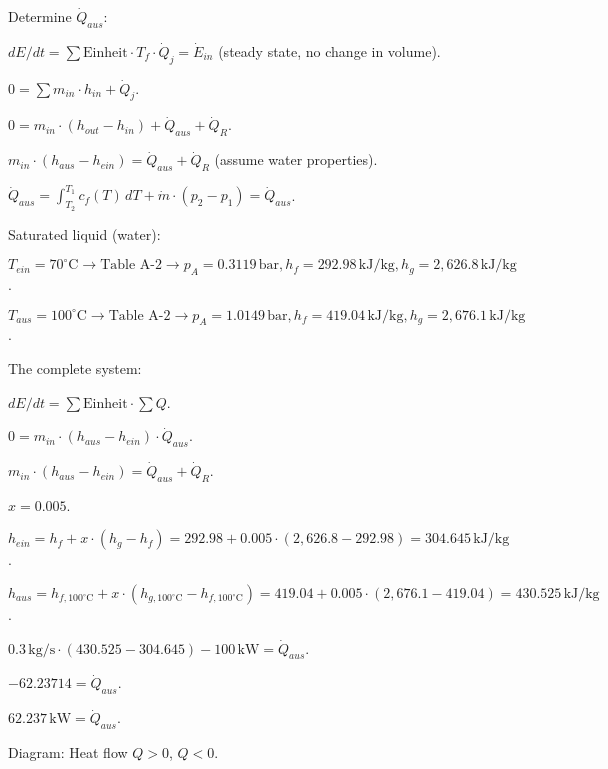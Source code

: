 Determine \( \dot{Q}_{aus} \):  

\( dE/dt = \sum \text{Einheit} \cdot T_f \cdot \dot{Q}_j = \dot{E}_{in} \) (steady state, no change in volume).  

\( 0 = \sum m_{in} \cdot h_{in} + \dot{Q}_{j} \).  

\( 0 = m_{in} \cdot (h_{out} - h_{in}) + \dot{Q}_{aus} + \dot{Q}_{R} \).  

\( m_{in} \cdot (h_{aus} - h_{ein}) = \dot{Q}_{aus} + \dot{Q}_{R} \) (assume water properties).  

\( \dot{Q}_{aus} = \int_{T_2}^{T_1} c_f(T) \, dT + \dot{m} \cdot (p_2 - p_1) = \dot{Q}_{aus} \).  

Saturated liquid (water):  

\( T_{ein} = 70^\circ \text{C} \rightarrow \text{Table A-2} \rightarrow p_A = 0.3119 \, \text{bar}, h_f = 292.98 \, \text{kJ/kg}, h_g = 2,626.8 \, \text{kJ/kg} \).  

\( T_{aus} = 100^\circ \text{C} \rightarrow \text{Table A-2} \rightarrow p_A = 1.0149 \, \text{bar}, h_f = 419.04 \, \text{kJ/kg}, h_g = 2,676.1 \, \text{kJ/kg} \).  

The complete system:  

\( dE/dt = \sum \text{Einheit} \cdot \sum Q \).  

\( 0 = m_{in} \cdot (h_{aus} - h_{ein}) \cdot \dot{Q}_{aus} \).  

\( m_{in} \cdot (h_{aus} - h_{ein}) = \dot{Q}_{aus} + \dot{Q}_{R} \).  

\( x = 0.005 \).  

\( h_{ein} = h_f + x \cdot (h_g - h_f) = 292.98 + 0.005 \cdot (2,626.8 - 292.98) = 304.645 \, \text{kJ/kg} \).  

\( h_{aus} = h_{f,100^\circ \text{C}} + x \cdot (h_{g,100^\circ \text{C}} - h_{f,100^\circ \text{C}}) = 419.04 + 0.005 \cdot (2,676.1 - 419.04) = 430.525 \, \text{kJ/kg} \).  

\( 0.3 \, \text{kg/s} \cdot (430.525 - 304.645) - 100 \, \text{kW} = \dot{Q}_{aus} \).  

\( -62.23714 = \dot{Q}_{aus} \).  

\( 62.237 \, \text{kW} = \dot{Q}_{aus} \).  

Diagram: Heat flow \( Q > 0 \), \( Q < 0 \).